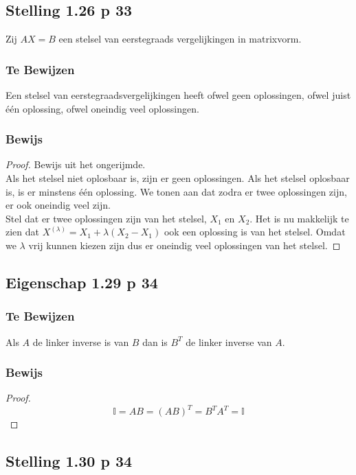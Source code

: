 \documentclass[lineaire_algebra_oplossingen.tex]{subfiles}
\begin{document}
\subsection{Stelling 1.26 p 33}
\label{1.26}
Zij $AX=B$ een stelsel van eerstegraads vergelijkingen in matrixvorm.

\subsubsection*{Te Bewijzen}
Een stelsel van eerstegraadsvergelijkingen heeft ofwel geen oplossingen, ofwel juist \'e\'en oplossing, ofwel oneindig veel oplossingen.

\subsubsection*{Bewijs}
\begin{proof}
Bewijs uit het ongerijmde.\\
Als het stelsel niet oplosbaar is, zijn er geen oplossingen. Als het stelsel oplosbaar is, is er minstens \'e\'en oplossing. We tonen aan dat zodra er twee oplossingen zijn, er ook oneindig veel zijn.\\
Stel dat er twee oplossingen zijn van het stelsel, $X_1$ en $X_2$. Het is nu makkelijk te zien dat $X^(\lambda) = X_1 + \lambda(X_2-X_1)$ ook een oplossing is van het stelsel. Omdat we $\lambda$ vrij kunnen kiezen zijn dus er oneindig veel oplossingen van het stelsel.
\end{proof}


\subsection{Eigenschap 1.29 p 34}
\label{1.29}
\subsubsection*{Te Bewijzen}
Als $A$ de linker inverse is van $B$ dan is $B^T$ de linker inverse van $A$.

\subsubsection*{Bewijs}
\begin{proof}
\[\mathbb{I} = AB= (AB)^T = B^TA^T = \mathbb{I}\]
\end{proof}


\subsection{Stelling 1.30 p 34}
\end{document}
